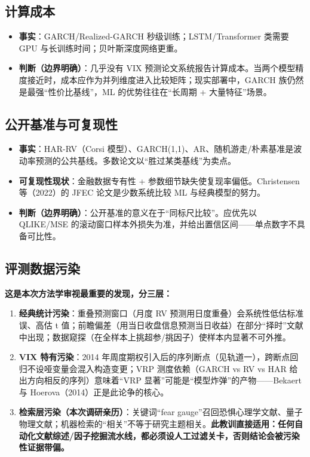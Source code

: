 \documentclass[11pt,a4paper]{article}
\begin{document}
\subsection{计算成本}

\begin{itemize}[leftmargin=2.2em]
  \item \textbf{事实}：GARCH/Realized-GARCH 秒级训练；LSTM/Transformer 类需要 GPU 与长训练时间；贝叶斯深度网络更重。
  \item \textbf{判断（边界明确）}：几乎没有 VIX 预测论文系统报告计算成本。当两个模型精度接近时，成本应作为并列维度进入比较矩阵；现实部署中，GARCH 族仍然是最强“性价比基线”，ML 的优势往往在“长周期 + 大量特征”场景。
\end{itemize}

\subsection{公开基准与可复现性}

\begin{itemize}[leftmargin=2.2em]
  \item \textbf{事实}：HAR-RV（Corsi 模型）、GARCH(1,1)、AR、随机游走/朴素基准是波动率预测的公共基线。多数论文以“胜过某类基线”为卖点。
  \item \textbf{可复现性现状}：金融数据专有性 + 参数细节缺失使复现率偏低。Christensen 等（2022）的 JFEC 论文是少数系统比较 ML 与经典模型的努力。
  \item \textbf{判断（边界明确）}：公开基准的意义在于“同标尺比较”。应优先以 QLIKE/MSE 的滚动窗口样本外损失为准，并给出置信区间——单点数字不具备可比性。
\end{itemize}

\subsection{评测数据污染}

\textbf{这是本次方法学审视最重要的发现，分三层：}

\begin{enumerate}[leftmargin=2.2em]
  \item \textbf{经典统计污染}：重叠预测窗口（月度 RV 预测用日度重叠）会系统性低估标准误、高估 t 值；前瞻偏差（用当日收盘信息预测当日收益）在部分“择时”文献中出现；数据窥探（在全样本上挑超参/挑因子）使样本内显著不可外推。
  \item \textbf{VIX 特有污染}：2014 年周度期权引入后的序列断点（见轨道一），跨断点回归不设哑变量会混入构造变更；VRP 测度依赖（GARCH vs RV vs HAR 给出方向相反的序列）意味着“VRP 显著”可能是“模型炸弹”的产物——Bekaert 与 Hoerova（2014）正是此论争的核心。
  \item \textbf{检索层污染（本次调研亲历）}：关键词“fear gauge”召回恐惧心理学文献、量子物理文献；机器检索的“相关”不等于研究主题相关。\textbf{此教训直接适用：任何自动化文献综述/因子挖掘流水线，都必须设人工过滤关卡，否则结论会被污染性证据带偏。}
\end{enumerate}
\end{document}
